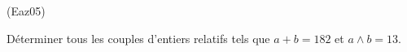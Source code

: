 \begin{tiny}(Eaz05)\end{tiny} D{\'e}terminer tous les couples d'entiers relatifs tels que $a+b=182$ et $a\wedge b=13$.
